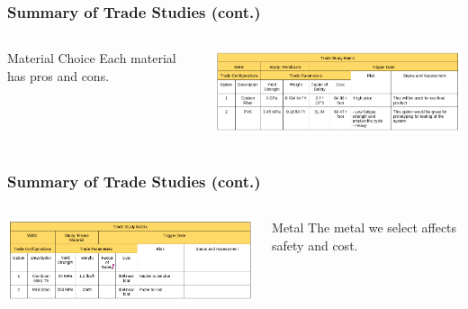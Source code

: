 \documentclass[aspectratio=169]{beamer}
\begin{document}
\begin{frame}
    \frametitle{Summary of Trade Studies (cont.)}

    \begin{columns}
        \begin{column}{0.28\textwidth}
            \begin{block}{Material Choice}
                Each material has pros and cons.
            \end{block}
        \end{column}

        \begin{column}{0.70\textwidth}
            \includegraphics[width=10.5cm]{MaterialTradeStudy}
        \end{column}
    \end{columns}

\end{frame}

\begin{frame}
    \frametitle{Summary of Trade Studies (cont.)}

    \begin{columns}
        \begin{column}{0.70\textwidth}
            \includegraphics[width=10.5cm]{MetalTradeStudy}
        \end{column}

        \begin{column}{0.28\textwidth}
            \begin{block}{Metal}
                The metal we select affects safety and cost.
            \end{block}
        \end{column}
    \end{columns}

\end{frame}
\end{document}
